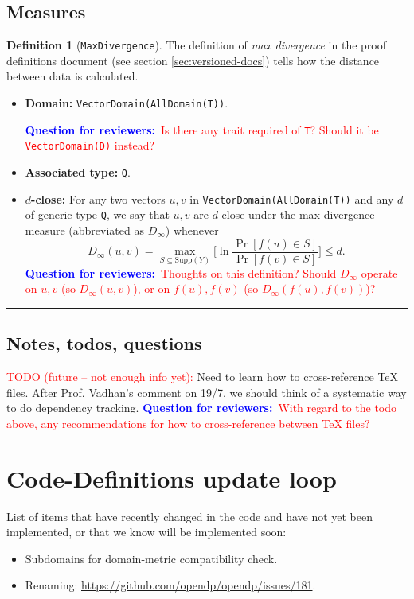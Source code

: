\documentclass[11pt,a4paper]{article}
\theoremstyle{definition}
\newtheorem{definition}[theorem]{Definition}
\newcommand{\horizline}{\noindent\rule{\textwidth}{1pt}}
\newcommand{\metricDefn}[1]{The definition of \emph{#1} in the proof definitions document (see section \ref{sec:versioned-docs}) tells how the distance between data is calculated.}
\newcommand{\questionr}[1]{\textcolor{blue}{\textbf{Question for reviewers:}}\textcolor{red}{~#1}}
\newcommand{\todonei}{{\textcolor{red}{TODO (future -- not enough info yet): }}}
\begin{document}
\subsection{Measures}
\begin{definition}[\texttt{MaxDivergence}]
    \metricDefn{max divergence} 
    \begin{itemize}
    \item \textbf{Domain:} \texttt{VectorDomain(AllDomain(T))}.
    
    \questionr{Is there any trait required of \texttt{T}? Should it be \texttt{VectorDomain(D)} instead?}
    \item \textbf{Associated type:} \texttt{Q}.
    \item \textbf{$d$-close:} For any two vectors $u, v$ in \texttt{VectorDomain(AllDomain(T))} and any $d$ of generic type \texttt{Q}, we say that $u, v$ are $d$-close under the max divergence measure (abbreviated as $D_{\infty}$) whenever
    \[
        D_{\infty}(u, v) = \max_{S \subseteq \textrm{Supp}(Y)} \Big[\ln \dfrac{\Pr[f(u) \in S]}{\Pr[f(v) \in S]} \Big] \leq d.
    \]
    \questionr{Thoughts on this definition? Should $D_{\infty}$ operate on $u,v$ (so $D_{\infty}(u,v)$), or on $f(u),f(v)$ (so $D_{\infty}(f(u),f(v))$)?}
\end{itemize}
\end{definition}
\horizline
\subsection{Notes, todos, questions}
\todonei{Need to learn how to cross-reference TeX files. After Prof. Vadhan's comment on 19/7, we should think of a systematic way to do dependency tracking.}
\questionr{With regard to the todo above, any recommendations for how to cross-reference between TeX files?}
\section{Code-Definitions update loop}
List of items that have recently changed in the code and have not yet been implemented, or that we know will be implemented soon:
\begin{itemize}
    \item Subdomains for domain-metric compatibility check.
    \item Renaming: \url{https://github.com/opendp/opendp/issues/181}.
\end{itemize}
\end{document}
